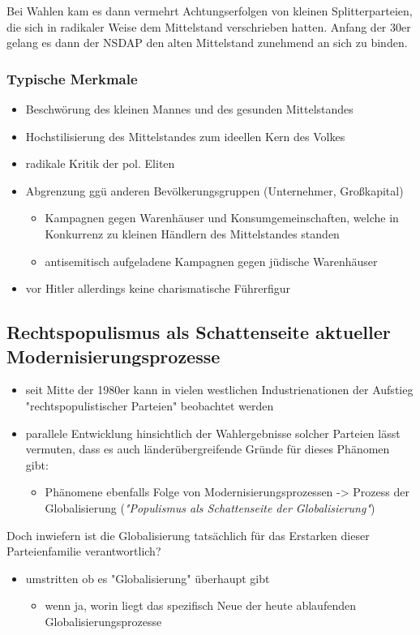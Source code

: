 \documentclass[11pt]{article}
\begin{document}
Bei Wahlen kam es dann vermehrt Achtungserfolgen von kleinen Splitterparteien, die sich in radikaler Weise dem Mittelstand verschrieben hatten. Anfang der 30er gelang es dann der NSDAP den alten Mittelstand zunehmend an sich zu binden.
\subsubsection{Typische Merkmale}
\label{sec:orge55705f}
\begin{itemize}
\item Beschwörung des kleinen Mannes und des gesunden Mittelstandes
\item Hochstilisierung des Mittelstandes zum ideellen Kern des Volkes
\item radikale Kritik der pol. Eliten
\item Abgrenzung ggü anderen Bevölkerungsgruppen (Unternehmer, Großkapital)
\begin{itemize}
\item Kampagnen gegen Warenhäuser und Konsumgemeinschaften, welche in Konkurrenz zu kleinen Händlern des Mittelstandes standen
\item antisemitisch aufgeladene Kampagnen gegen jüdische Warenhäuser
\end{itemize}
\item vor Hitler allerdings keine charismatische Führerfigur
\end{itemize}
\subsection{Rechtspopulismus als Schattenseite aktueller Modernisierungsprozesse}
\label{sec:orgc724736}
\begin{itemize}
\item seit Mitte der 1980er kann in vielen westlichen Industrienationen der Aufstieg "rechtspopulistischer Parteien" beobachtet werden
\item parallele Entwicklung hinsichtlich der Wahlergebnisse solcher Parteien lässt vermuten, dass es auch länderübergreifende Gründe für dieses Phänomen gibt:
\begin{itemize}
\item Phänomene ebenfalls Folge von Modernisierungsprozessen -> Prozess der Globalisierung (\emph{"Populismus als Schattenseite der Globalisierung"})
\end{itemize}
\end{itemize}

Doch inwiefern ist die Globalisierung tatsächlich für das Erstarken dieser Parteienfamilie verantwortlich?
\begin{itemize}
\item umstritten ob es "Globalisierung" überhaupt gibt
\begin{itemize}
\item wenn ja, worin liegt das spezifisch Neue der heute ablaufenden Globalisierungsprozesse
\end{itemize}
\end{itemize}
\end{document}
